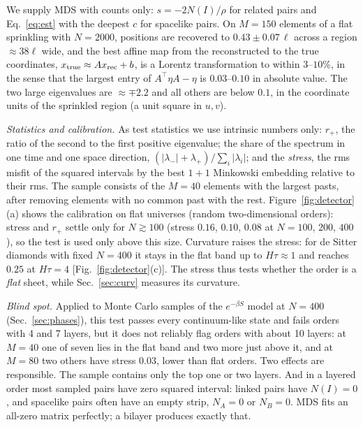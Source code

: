 \documentclass[prd,twocolumn,superscriptaddress,nofootinbib,amsmath,amssymb,floatfix]{revtex4-2}
\providecommand{\DIFaddtex}[1]{{\protect\color{blue}\uwave{#1}}} %
\providecommand{\DIFaddbegin}{} %
\providecommand{\DIFaddend}{} %
\providecommand{\DIFadd}[1]{\texorpdfstring{\DIFaddtex{#1}}{#1}} %
\providecommand{\DIFaddincludegraphics}[2][]{{\color{blue}\fbox{\DIFOincludegraphics[#1]{#2}}}} %
\DeclareRobustCommand{\DIFaddbegin}{\DIFOaddbegin \let\includegraphics\DIFaddincludegraphics} %
\DeclareRobustCommand{\DIFaddend}{\DIFOaddend \let\includegraphics\DIFOincludegraphics} %
\begin{document}
We supply MDS with counts only: $s=-2N(I)/\rho$ for related pairs and Eq.~\eqref{eq:est} with the deepest $c$ for spacelike pairs. On $M=150$ elements of a flat sprinkling with $N=2000$, positions are recovered to $0.43\pm0.07\,\ell$ across a region $\approx38\ell$ wide, and the best affine map from the reconstructed to the true coordinates, $x_{\rm true}\approx Ax_{\rm rec}+b$, is a Lorentz transformation to within $3$--$10\%$, in the sense that the largest entry of $A^{\top}\eta A-\eta$ is $0.03$--$0.10$ in absolute value. The two large eigenvalues are $\approx\mp2.2$ and all others are below $0.1$, in the coordinate units of the sprinkled region (a unit square in $u,v$).

\emph{Statistics and calibration.} As test statistics we use intrinsic numbers only: $r_+$, the ratio of the second to the first positive eigenvalue; the share of the spectrum in one time and one space direction, $(|\lambda_-|+\lambda_+)/\sum_i|\lambda_i|$; and the \emph{stress}, the rms misfit of the squared intervals by the best $1+1$ Minkowski embedding relative to their rms. The sample consists of the $M=40$ elements with the largest pasts, after removing elements with no common past with the rest. Figure~\ref{fig:detector}(a) shows the calibration on flat universes (random two-dimensional orders): stress and $r_+$ settle only for $N\gtrsim100$ (stress $0.16$, $0.10$, $0.08$ at $N=100$, $200$, $400$), so the test is used only above this size. Curvature raises the stress: for de Sitter diamonds with fixed $N=400$ it stays in the flat band up to $H\tau\approx1$ and reaches $0.25$ at $H\tau=4$ [Fig.~\ref{fig:detector}(c)]. The stress thus tests whether the order is a \emph{flat} sheet, while Sec.~\ref{sec:curv} measures its curvature.

\emph{Blind spot.} Applied to Monte Carlo samples of the $e^{-\beta S}$ model at $N=400$ (Sec.~\ref{sec:phases}), this test passes every continuum-like state \DIFaddbegin \DIFadd{at that size (not at $N=800$; Sec.~\ref{sec:phases}) }\DIFaddend and fails orders with 4 and 7 layers, but it does not reliably flag orders with about 10 layers: at $M=40$ one of seven lies in the flat band and two more just above it, and at $M=80$ two others have stress $0.03$, lower than flat orders. Two effects are responsible. The sample contains only the top one or two layers. And in a layered order most sampled pairs have zero squared interval: linked pairs have $N(I)=0$, and spacelike pairs often have an empty strip, $N_A=0$ or $N_B=0$. MDS fits an all-zero matrix perfectly; a bilayer produces exactly that.
\end{document}
